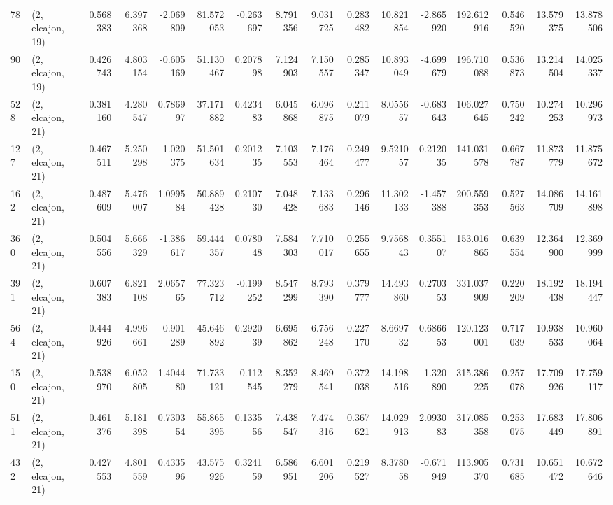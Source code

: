\begin{tabular}{llrrrrrrrrrrrrrr}
78  &  (2, elcajon, 19) &   0.568383 &   6.397368 &  -2.069809 &    81.572053 &  -0.263697 &   8.791356 &   9.031725 &  0.283482 &  10.821854 &  -2.865920 &   192.612916 &  0.546520 &  13.579375 &  13.878506 \\
90  &  (2, elcajon, 19) &   0.426743 &   4.803154 &  -0.605169 &    51.130467 &   0.207898 &   7.124903 &   7.150557 &  0.285347 &  10.893049 &  -4.699679 &   196.710088 &  0.536873 &  13.214504 &  14.025337 \\
528 &  (2, elcajon, 21) &   0.381160 &   4.280547 &   0.786997 &    37.171882 &   0.423483 &   6.045868 &   6.096875 &  0.211079 &   8.055657 &  -0.683643 &   106.027645 &  0.750242 &  10.274253 &  10.296973 \\
127 &  (2, elcajon, 21) &   0.467511 &   5.250298 &  -1.020375 &    51.501634 &   0.201235 &   7.103553 &   7.176464 &  0.249477 &   9.521057 &   0.212035 &   141.031578 &  0.667787 &  11.873779 &  11.875672 \\
162 &  (2, elcajon, 21) &   0.487609 &   5.476007 &   1.099584 &    50.889428 &   0.210730 &   7.048428 &   7.133683 &  0.296146 &  11.302133 &  -1.457388 &   200.559353 &  0.527563 &  14.086709 &  14.161898 \\
360 &  (2, elcajon, 21) &   0.504556 &   5.666329 &  -1.386617 &    59.444357 &   0.078048 &   7.584303 &   7.710017 &  0.255655 &   9.756843 &   0.355107 &   153.016865 &  0.639554 &  12.364900 &  12.369999 \\
391 &  (2, elcajon, 21) &   0.607383 &   6.821108 &   2.065765 &    77.323712 &  -0.199252 &   8.547299 &   8.793390 &  0.379777 &  14.493860 &   0.270353 &   331.037909 &  0.220209 &  18.192438 &  18.194447 \\
564 &  (2, elcajon, 21) &   0.444926 &   4.996661 &  -0.901289 &    45.646892 &   0.292039 &   6.695862 &   6.756248 &  0.227170 &   8.669732 &   0.686653 &   120.123001 &  0.717039 &  10.938533 &  10.960064 \\
150 &  (2, elcajon, 21) &   0.538970 &   6.052805 &   1.404480 &    71.733121 &  -0.112545 &   8.352279 &   8.469541 &  0.372038 &  14.198516 &  -1.320890 &   315.386225 &  0.257078 &  17.709926 &  17.759117 \\
511 &  (2, elcajon, 21) &   0.461376 &   5.181398 &   0.730354 &    55.865395 &   0.133556 &   7.438547 &   7.474316 &  0.367621 &  14.029913 &   2.093083 &   317.085358 &  0.253075 &  17.683449 &  17.806891 \\
432 &  (2, elcajon, 21) &   0.427553 &   4.801559 &   0.433596 &    43.575926 &   0.324159 &   6.586951 &   6.601206 &  0.219527 &   8.378058 &  -0.671949 &   113.905370 &  0.731685 &  10.651472 &  10.672646 \\

\end{tabular}
